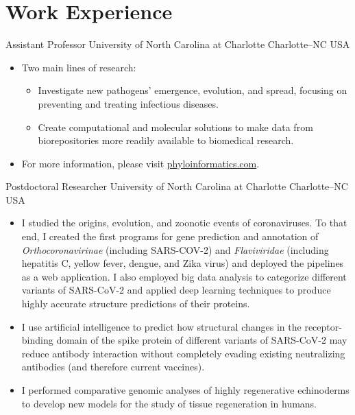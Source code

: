 \documentclass[11pt, letterpaper, sans]{moderncv}
\begin{document}

\vspace{-1.5em}

\section{Work Experience}
		{Assistant Professor}
		{University of North Carolina at Charlotte}
		{Charlotte--NC}
		{USA}
		{}
	\vspace{-1em}
	\begin{itemize}[itemsep=-0.05in, labelindent=0in, leftmargin=1cm]\small
		\item[\textcolor{color1}{\textbullet}] Two main lines of research:
		\begin{itemize}[itemsep=-0.05in, labelindent=0in, leftmargin=1cm]\small
			\item[\textcolor{color1}{\textbullet}] Investigate new pathogens’ emergence, evolution, and spread, focusing on preventing and treating infectious diseases.
			\item[\textcolor{color1}{\textbullet}] Create computational and molecular solutions to make data from biorepositories more readily available to biomedical research.
	\end{itemize}
	\item[\textcolor{color1}{\textbullet}] For more information, please visit \href{https://phyloinformatics.com/}{phyloinformatics.com}.
	\end{itemize}
	\vspace{-0.5em}
    	{Postdoctoral Researcher}
    	{University of North Carolina at Charlotte}
    	{Charlotte--NC}
    	{USA}
    	{}
    \vspace{-1em}
    \begin{itemize}[itemsep=-0.05in, labelindent=0in, leftmargin=1cm]\small
	    \item[\textcolor{color1}{\textbullet}] I studied the origins, evolution, and zoonotic events of coronaviruses. To that end, I created the first programs for gene prediction and annotation of \textit{Orthocoronavirinae} (including SARS-COV-2) and \textit{Flaviviridae} (including hepatitis C, yellow fever, dengue, and Zika virus) and deployed the pipelines as a web application. I also employed big data analysis to categorize different variants of SARS-CoV-2 and applied deep learning techniques to produce highly accurate structure predictions of their proteins.
	    \item[\textcolor{color1}{\textbullet}] I use artificial intelligence to predict how structural changes in the receptor-binding domain of the spike protein of different variants of SARS-CoV-2 may reduce antibody interaction without completely evading existing neutralizing antibodies (and therefore current vaccines).
	    \item[\textcolor{color1}{\textbullet}] I performed comparative genomic analyses of highly regenerative echinoderms to develop new models for the study of tissue regeneration in humans.
	\end{itemize}
\end{document}
